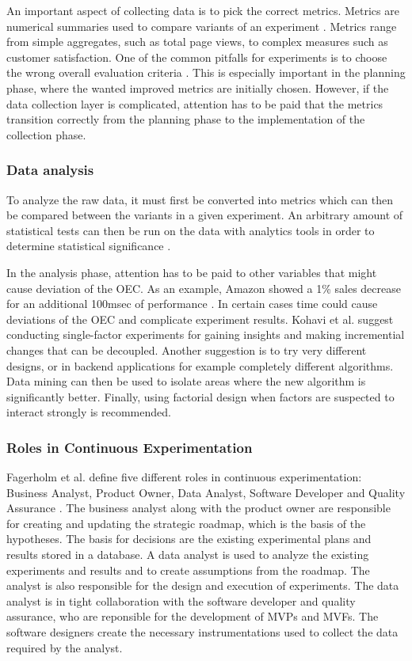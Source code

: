 \documentclass[english, grading]{tktltiki2}
\theoremstyle{definition}
\theoremstyle{remark}
\begin{document}
An important aspect of collecting data is to pick the correct metrics. Metrics are numerical summaries used to compare variants of an experiment \cite{kohavi2009controlled}. Metrics range from simple aggregates, such as total page views, to complex measures such as customer satisfaction. One of the common pitfalls for experiments is to choose the wrong overall evaluation criteria \cite{crook2009seven}. This is especially important in the planning phase, where the wanted improved metrics are initially chosen. However, if the data collection layer is complicated, attention has to be paid that the metrics transition correctly from the planning phase to the implementation of the collection phase.  
\subsubsection{Data analysis}
To analyze the raw data, it must first be converted into metrics which can then be compared between the variants in a given experiment. An arbitrary amount of statistical tests can then be run on the data with analytics tools in order to determine statistical significance \cite{kohavi2009controlled}. 

In the analysis phase, attention has to be paid to other variables that might cause deviation of the OEC. As an example, Amazon showed a 1\% sales decrease for an additional 100msec of performance \cite{kohavi2007practical}. In certain cases time could cause deviations of the OEC and complicate experiment results. Kohavi et al. suggest conducting single-factor experiments for gaining insights and making incremential changes that can be decoupled. Another suggestion is to try very different designs, or in backend applications for example completely different algorithms. Data mining can then be used to isolate areas where the new algorithm is significantly better. Finally, using factorial design when factors are suspected to interact strongly is recommended. 


\subsubsection{Roles in Continuous Experimentation}
Fagerholm et al. define five different roles in continuous experimentation: Business Analyst, Product Owner, Data Analyst, Software Developer and Quality Assurance \cite{fagerholm2014building}. The business analyst along with the product owner are responsible for creating and updating the strategic roadmap, which is the basis of the hypotheses. The basis for decisions are the existing experimental plans and results stored in a database. A data analyst is used to analyze the existing experiments and results and to create assumptions from the roadmap. The analyst is also responsible for the design and execution of experiments. The data analyst is in tight collaboration with the software developer and quality assurance, who are reponsible for the development of MVPs and MVFs. The software designers create the necessary instrumentations used to collect the data required by the analyst.
\end{document}
